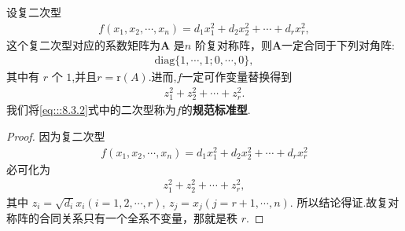 \documentclass[../../main.tex]{subfiles}%
\begin{document}
\begin{theorem}[复二次型的规范标准型]\label{theorem:复二次型的规范标准型}
设复二次型
\begin{align*}
f(x_1,x_2,\cdots,x_n)=d_1x_1^2 + d_2x_2^2 + \cdots + d_rx_r^2,
\end{align*}
这个复二次型对应的系数矩阵为$\boldsymbol{A}$ 是$n$ 阶复对称阵，则$\boldsymbol{A}$一定合同于下列对角阵:
\begin{align}
\mathrm{diag}\{1,\cdots,1;0,\cdots,0\},\label{eq:::8.3.3}
\end{align}
其中有 $r$ 个 $1$,并且$r=\mathrm{r}\left( A \right)$.进而,$f$一定可作变量替换得到
\begin{align}
z_1^2 + z_2^2 + \cdots + z_r^2.\label{eq:::8.3.2}
\end{align}
我们将\eqref{eq:::8.3.2}式中的二次型称为$f$的\textbf{规范标准型}.
\end{theorem}
\begin{proof}

因为复二次型
\begin{align*}
f(x_1,x_2,\cdots,x_n)=d_1x_1^2 + d_2x_2^2 + \cdots + d_rx_r^2
\end{align*}
必可化为
\begin{align*}
z_1^2 + z_2^2 + \cdots + z_r^2,
\end{align*}
其中 $z_i = \sqrt{d_i}x_i (i = 1,2,\cdots,r)$, $z_j = x_j (j = r + 1,\cdots,n)$. 所以结论得证.故复对称阵的合同关系只有一个全系不变量，那就是秩 $r$. 

\end{proof}
\end{document}
